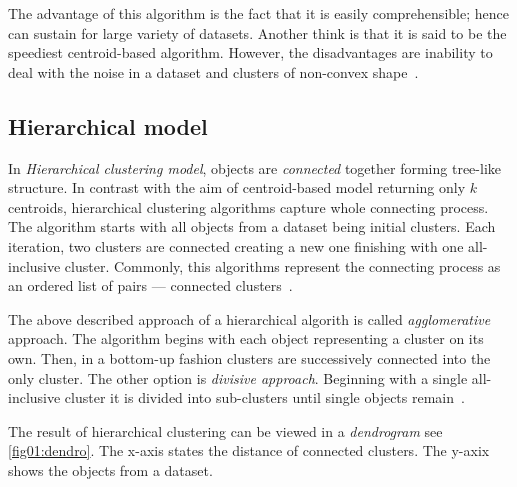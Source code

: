 The advantage of this algorithm is the fact that it is easily comprehensible; hence can sustain for large variety of datasets. Another think is that it is said to be the speediest centroid-based algorithm. However, the disadvantages are inability to deal with the noise in a dataset and clusters of non-convex shape~\cite{uppada2014centroid}.
  

\subsection{Hierarchical model}

In \emph{Hierarchical clustering model}, objects are \emph{connected} together forming tree-like structure. In contrast with the aim of centroid-based model returning only $k$ centroids, hierarchical clustering algorithms capture whole connecting process. The algorithm starts with all objects from a dataset being initial clusters. Each iteration, two clusters are connected creating a new one finishing with one all-inclusive cluster. Commonly, this algorithms represent the connecting process as an ordered list of pairs --- connected clusters~\cite{karypis1999chameleon}.

The above described approach of a hierarchical algorith is called \emph{agglomerative} approach. The algorithm begins with each object representing a cluster on its own. Then, in a bottom-up fashion clusters are successively connected into the only cluster. The other option is \emph{divisive approach}. Beginning with a single all-inclusive cluster it is divided into sub-clusters until single objects remain~\cite{rokach2005clustering}. 

The result of hierarchical clustering can be viewed in a \emph{dendrogram} see \ref{fig01:dendro}. The x-axis states the distance of connected clusters. The y-axix shows the objects from a dataset.

